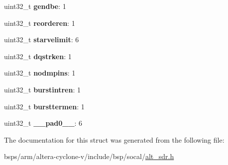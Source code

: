 \begin{DoxyCompactItemize}
uint32\+\_\+t {\bfseries gendbe}\+: 1
\item 
\mbox{\label{structALT__SDR__CTL__CTLCFG__s_a2f8d9a5596c765a406d4e0123a4b8306}} 
uint32\+\_\+t {\bfseries reorderen}\+: 1
\item 
\mbox{\label{structALT__SDR__CTL__CTLCFG__s_aac2c44fdec6d2a5307cff9c0a857bb7c}} 
uint32\+\_\+t {\bfseries starvelimit}\+: 6
\item 
\mbox{\label{structALT__SDR__CTL__CTLCFG__s_a8c20c6ac9ed0c5842debd84dfd1cd36a}} 
uint32\+\_\+t {\bfseries dqstrken}\+: 1
\item 
\mbox{\label{structALT__SDR__CTL__CTLCFG__s_a98be5d32808a351d5e7d7514468e2788}} 
uint32\+\_\+t {\bfseries nodmpins}\+: 1
\item 
\mbox{\label{structALT__SDR__CTL__CTLCFG__s_a658ce8beeb358cbb71a9b5435d035682}} 
uint32\+\_\+t {\bfseries burstintren}\+: 1
\item 
\mbox{\label{structALT__SDR__CTL__CTLCFG__s_a65495d9518fd17058c66a60a84087df2}} 
uint32\+\_\+t {\bfseries bursttermen}\+: 1
\item 
\mbox{\label{structALT__SDR__CTL__CTLCFG__s_a6737e7d62ca5a85df802ff7ed09f2fe0}} 
uint32\+\_\+t {\bfseries \+\_\+\+\_\+pad0\+\_\+\+\_\+}\+: 6
\end{DoxyCompactItemize}


The documentation for this struct was generated from the following file\+:\begin{DoxyCompactItemize}
\item 
bsps/arm/altera-\/cyclone-\/v/include/bsp/socal/\mbox{\hyperlink{alt__sdr_8h}{alt\+\_\+sdr.\+h}}\end{DoxyCompactItemize}
